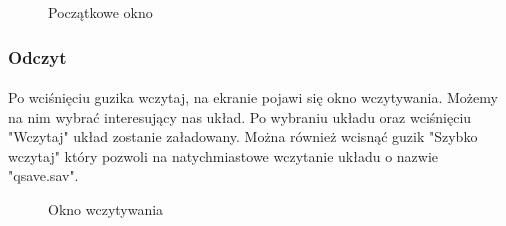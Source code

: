 \begin{figure}[ht!]
\centering
{}
\caption{Początkowe okno}
\label{fig:inst_00}
\end{figure}

\subsubsection{Odczyt}\label{ssub:odczyt}
\paragraph{}

Po wciśnięciu guzika wczytaj, na ekranie pojawi się okno wczytywania. Możemy na nim wybrać interesujący nas układ. Po wybraniu układu oraz wciśnięciu "Wczytaj" układ zostanie załadowany. Można również wcisnąć guzik "Szybko wczytaj" który pozwoli na natychmiastowe wczytanie układu o nazwie "qsave.sav".

\begin{figure}[ht!]
\centering
{}
\caption{Okno wczytywania}
\label{fig:inst_01}
\end{figure}

